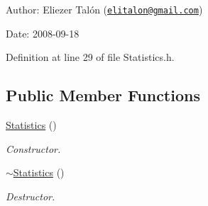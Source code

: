 \begin{Desc}
\item[Author:]Eliezer Talón (\href{mailto:elitalon@gmail.com}{\tt elitalon@gmail.com}) \end{Desc}
\begin{Desc}
\item[Date:]2008-09-18 \end{Desc}


Definition at line 29 of file Statistics.h.\subsection*{Public Member Functions}
\begin{CompactItemize}
\item 
\hyperlink{struct_statistics_60ddd90a571ed4c3ce8c0f6317a36d63}{Statistics} ()
\begin{CompactList}\small\item\em Constructor. \item\end{CompactList}\item 
\hyperlink{struct_statistics_b68ede75479e44d5c35b78ec1284065b}{$\sim$Statistics} ()
\begin{CompactList}\small\item\em Destructor. \item\end{CompactList}\end{CompactItemize}
